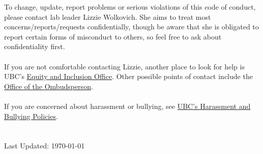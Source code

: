 \documentclass[11pt,a4paper,oneside]{article}
\begin{document}
To change, update, report problems or serious violations of this code of conduct, please contact lab leader Lizzie Wolkovich. She aims to treat most concerns/reports/requests  confidentially, though be aware that she is obligated to report certain forms of misconduct to others, so feel free to ask about confidentiality first. \\
\\
\noindent
If you are not comfortable contacting Lizzie, another place to look for help is UBC’s \href{https://equity.ubc.ca/how-we-can-help/}{Equity and Inclusion Office}. Other possible points of contact include the \href{https://ombudsoffice.ubc.ca/}{Office of the Ombudsperson}.\\
\\
\noindent
If you are concerned about harassment or bullying, see \href{https://bullyingandharassment.ubc.ca/resources/}{UBC’s Harassment and Bullying Policies}.\\
\\
\\
Last Updated: \today
\end{document}
